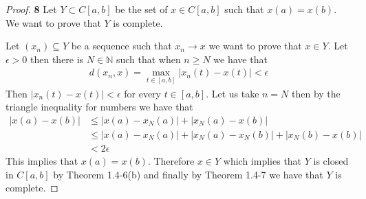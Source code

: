 \documentclass[11pt]{article}
\newcommand{\N}{\mathbb{N}}
\theoremstyle{definition}
\begin{document}
\begin{proof}{\textbf{8}}
    Let $Y \subset C[a,b]$ be the set of $x \in C[a,b]$ such that $x(a) = x(b)$.
    We want to prove that $Y$ is complete.

    Let $(x_n) \subseteq Y$ be a sequence such that $x_n \to x$ we want to prove
    that $x \in Y$. Let $\epsilon > 0$ then there is $N \in \N$ such that when
    $n \geq N$ we have that
    \begin{align*}
        d(x_n, x) = \max_{t \in [a,b]} |x_n(t) - x(t)| < \epsilon
    \end{align*}
    Then $|x_n(t) - x(t)| < \epsilon$ for every $t \in [a,b]$.
    Let us take $n = N$ then by the triangle inequality for numbers we have that 
    \begin{align*}
        |x(a) - x(b)| &\leq |x(a) - x_N(a)| + |x_N(a) - x(b)|\\
            &\leq |x(a) - x_N(a)| + |x_N(a) - x_N(b)| + |x_N(b) - x(b)|\\
            &< 2\epsilon
    \end{align*}
    This implies that $x(a) = x(b)$. Therefore $x \in Y$ which implies that
    $Y$ is closed in $C[a,b]$ by Theorem 1.4-6(b) and finally by Theorem 1.4-7
    we have that $Y$ is complete.
\end{proof}
\cleardoublepage
\end{document}
